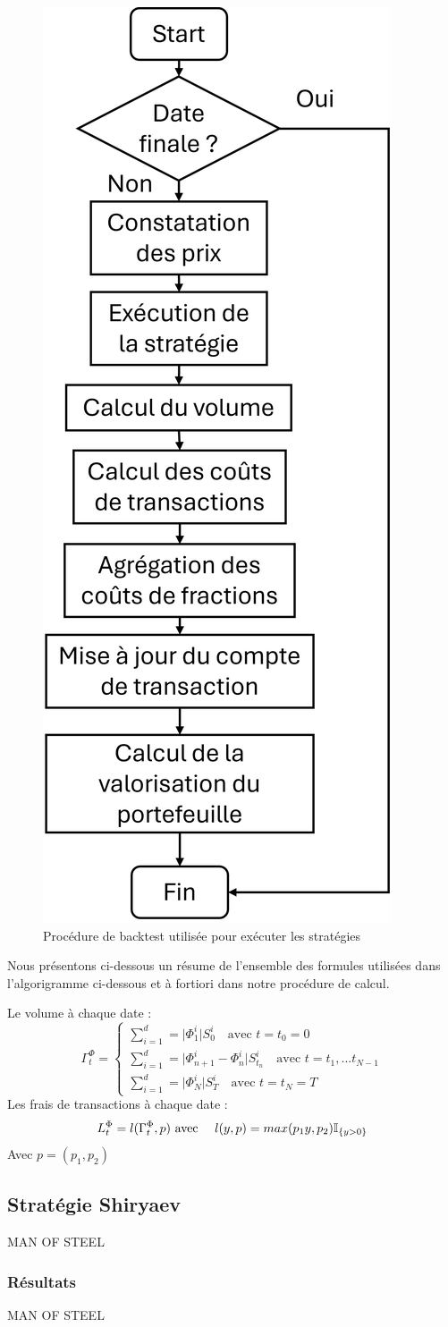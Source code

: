 \documentclass[12pt,a4paper]{article}
\begin{document}
\begin{figure}[H]
    \centering
    \includegraphics[width=0.25\linewidth]{img/schema_backtest.png}
    \caption{Procédure de backtest utilisée pour exécuter les stratégies}
    \label{fig:enter-label}
\end{figure}
Nous présentons ci-dessous un résume de l'ensemble des formules utilisées dans l'algorigramme ci-dessous et à fortiori dans notre procédure de calcul.


Le volume à chaque date :
\begin{equation}
     \Gamma_t^\Phi=\begin{cases}
     \sum_ {i=1}^d = \vert \Phi_1^i\vert S_0 ^i \quad \text{avec } t=t_0=0\\
     \sum_ {i=1}^d = \vert \Phi_{n+1}^i-\Phi_n^i\vert S_{t_n}^i \quad \text{avec } t=t_1,...t_{N-1} \\
     \sum_ {i=1}^d = \vert \Phi_N^i\vert S_T ^i  \quad \text{avec } t=t_N=T
     \end{cases}
\end{equation}
Les frais de transactions à chaque date :
\begin{equation}
     L_t^\Phi=l(\Gamma_t^\Phi,p)  \\
     \text { avec } \quad l(y,p)=max(p_1y,p_2)\mathbb{I}_{\{y>0\}}
\end{equation}
Avec $p=(p_1,p_2)$
\subsection{Stratégie Shiryaev}\label{subsec:strategieshiryaev}
MAN OF STEEL
\subsubsection{Résultats}\label{subsubsec:strategieshiryaevfees}
MAN OF STEEL
\end{document}
